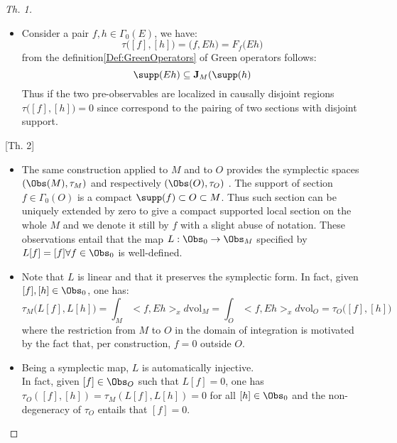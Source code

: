 \documentclass[Main]{subfiles}
\begin{document}
				\begin{proof}
				[Th. 1]
					\begin{itemize}
						\item Consider a pair $f,h \in \Gamma_0 (E)$, we have: 
							\begin{displaymath}
								\tau \big([f] , [h] \big) = \big(f, Eh \big) = F_f \big( E h \big)
							\end{displaymath}
							from the definition\ref{Def:GreenOperators} of Green operators follows:
							\begin{displaymath}
								\supp ( E h) \subseteq \textbf{J}_M ( \supp(h)
							\end{displaymath}
							Thus if the two pre-observables are localized in causally disjoint regions $\tau \big([f] , [h] \big)=0 $ since correspond to the pairing of two sections with disjoint support.	
					\end{itemize}
				[Th. 2]
					\begin{itemize}
								\item %
									The same construction applied to $M$ and to $O$ provides the symplectic spaces $(\Obs(M),\tau_M)$ and respectively $(\Obs(O),\tau_O)$ . 
									The support of section $f \in \Gamma_0(O)$  is a compact $\supp(f) \subset O \subset M$. Thus such section can be uniquely extended by zero to give a compact supported local section on the whole $M$ and we denote it still by $f$ with a slight abuse of notation.
									These observations entail that the map $L: \Obs_0 \rightarrow \Obs_M$ specified by $L [f]= [f] \forall f \in \Obs_0$ is well-defined.
								\item %
									Note that $L$ is linear and that it preserves the symplectic form. In fact, given $[ f ], [h] \in \Obs_0$, one has:
									\begin{displaymath}
										\tau_M \big(L[f], L[h] \big)= \int_M <f, Eh>_x d\textrm{vol}_M =
										 \int_O <f, Eh>_x d\textrm{vol}_O = \tau_O \big([f],[h])
									\end{displaymath}
									where the restriction from $M$ to $O$ in the domain of integration is motivated by the fact that, per construction, $f = 0$ outside $O$.
								\item Being a symplectic map, $L$ is automatically injective. \\
									In fact, given $[ f ] \in \Obs_O$ such that $L[ f ] = 0$, one has $\tau_O([ f ], [h]) = \tau_M(L[ f ],L[h]) = 0$ for all $[h] \in \Obs_0$ and the non-degeneracy of $\tau_O$ entails that $[ f ] = 0$.

\end{itemize}
\end{proof}
\end{document}
